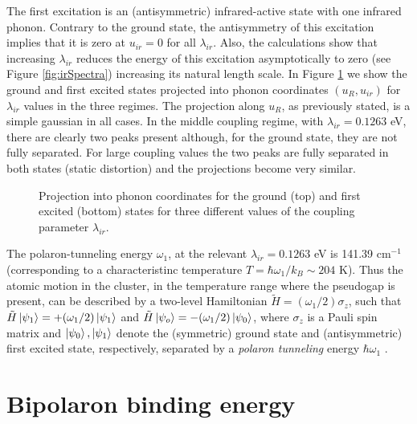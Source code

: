 The first excitation is an (antisymmetric) infrared-active state with one infrared phonon.
Contrary to the ground state, the antisymmetry of this excitation implies that it is zero at $u_{ir}=0$ for all $\lambda_{ir}$.
Also, the calculations show that increasing $\lambda_{ir}$ reduces the energy of this excitation asymptotically to zero (see Figure \ref{fig:irSpectra}) increasing its natural length scale. 
In Figure \ref{fig:phononProjGrdPol} we show the ground and first excited states projected into phonon coordinates $(u_R,u_{ir})$ for $\lambda_{ir}$ values in the three regimes.
The projection along $u_R$, as previously stated, is a simple gaussian in all cases.
In the middle coupling regime, with $\lambda_{ir}=0.1263$ eV, there are clearly two peaks present although, for the ground state, they are not fully separated.
For large coupling values the two peaks are fully separated in both states (static distortion) and the projections become very similar.

\begin{figure}[ht]
  \centering
  
  \caption[Ground and first excited states projected into phonon coordinates.]
  {Projection into phonon coordinates for the ground (top) and first excited (bottom) states for three different values of the coupling parameter $\lambda_{ir}$.}
  \label{fig:phononProjGrdPol}
\end{figure}

The polaron-tunneling energy $\omega_1$, at the relevant $\lambda_{ir}=0.1263$ eV is 141.39 cm$^{-1}$ (corresponding to a characteristinc temperature $T=\hbar\omega_1 / k_B \sim 204$ K).
Thus the atomic motion in the cluster, in the temperature range where the pseudogap is present, can be described by a two-level Hamiltonian $\tilde{H}=(\omega_1/2)\sigma_z$,  such that $\tilde{H}\left | \psi_1 \right\rangle=+(\omega_1/2)\left | \psi_1 \right\rangle$ and $\tilde{H}\left | \psi_o \right\rangle=-(\omega_1/2)\left | \psi_0 \right\rangle$, where $\sigma_z$ is a Pauli spin matrix and $\left | \psi_0 \right\rangle,\left | \psi_1 \right\rangle$ denote the (symmetric) ground state and (antisymmetric) first excited state, respectively, separated by a \textit{polaron tunneling} energy $\hbar\omega_1$ \cite{MustredeLeon1990}.


\section{Bipolaron binding energy}
\label{sec:PolBindingEnergy}

